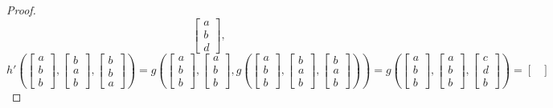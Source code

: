 \documentclass[11pt]{amsart}
\theoremstyle{definition}
\theoremstyle{remark}
\theoremstyle{plain}
\begin{document}
\begin{enumerate}[wide, labelindent=0pt]
\begin{proof}
\begin{equation*}
\begin{bmatrix}
a \\
b\\
d
\end{bmatrix},
\end{equation*}
\begin{equation*}
h'\left(
\begin{bmatrix}
a \\
b \\
b
\end{bmatrix}\!,\!
\begin{bmatrix}
b \\
a \\
b
\end{bmatrix}\!,\!
\begin{bmatrix}
b \\
b \\
a
\end{bmatrix}
\right)=
g\left(
\begin{bmatrix}
a \\
b \\
b
\end{bmatrix}\!,\!
\begin{bmatrix}
a \\
b \\
b
\end{bmatrix}\!,\!
g\left(
\begin{bmatrix}
a \\
b \\
b
\end{bmatrix}\!,\!
\begin{bmatrix}
b \\
a \\
b
\end{bmatrix}\!,\!
\begin{bmatrix}
b \\
a \\
b
\end{bmatrix}
\right)
\right)=
g\left(
\begin{bmatrix}
a \\
b \\
b
\end{bmatrix}\!,\!
\begin{bmatrix}
a \\
b \\
b
\end{bmatrix}\!,\!
\begin{bmatrix}
c \\
d \\
b
\end{bmatrix}
\right)=
\begin{bmatrix}

\end{bmatrix}
\end{equation*}
\end{proof}
\end{enumerate}
\end{document}
